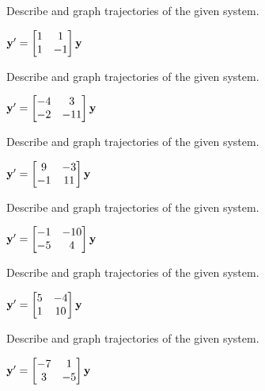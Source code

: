 \documentclass{ximera}
\begin{document}
\begin{problem}\label{exer:10.4.29}  
Describe and graph trajectories of the given system.

${\bf y}'=\begin{bmatrix}1&1\\1&-1\end{bmatrix}{\bf y}$
\end{problem}

\begin{problem}\label{exer:10.4.30}
Describe and graph trajectories of the given system.

${\bf y}'=\begin{bmatrix}-4&3\\-2&-11\end{bmatrix}{\bf
y}$
\end{problem}


\begin{problem}\label{exer:10.4.31} 
Describe and graph trajectories of the given system.

${\bf y}'=\begin{bmatrix}9&-3\\-1&11\end{bmatrix}{\bf
y}$
\end{problem}

\begin{problem}\label{exer:10.4.32} 
Describe and graph trajectories of the given system.

${\bf
y}'=\begin{bmatrix}-1&-10\\-5&4\end{bmatrix}{\bf y}$
\end{problem}


\begin{problem}\label{exer:10.4.33}
Describe and graph trajectories of the given system.

${\bf y}'= \begin{bmatrix}5&-4\\1&10\end{bmatrix}{\bf
y}$
\end{problem}

\begin{problem}\label{exer:10.4.34} 
Describe and graph trajectories of the given system.

${\bf
y}'= \begin{bmatrix}-7&1\\3 &-5\end{bmatrix}{\bf y}$
\end{problem}
\end{document}
